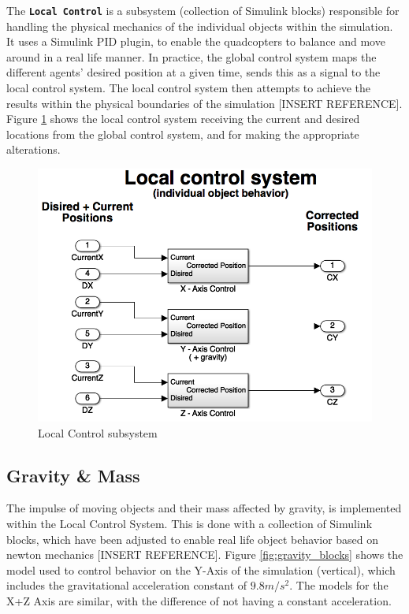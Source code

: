 The \textbf{\texttt{Local Control}} is a subsystem (collection of Simulink blocks) responsible for handling the physical mechanics of the individual objects within the simulation. It uses a Simulink PID plugin, to enable the quadcopters to balance and move around in a real life manner. In practice, the global control system maps the different agents' desired position at a given time, sends this as a signal to the local control system. The local control system then attempts to achieve the results within the physical boundaries of the simulation [INSERT REFERENCE]. Figure \ref{fig:local_control} shows the local control system receiving the current and desired locations from the global control system, and for making the appropriate alterations.

\begin{figure}
	\centering
	\includegraphics[width=.7\columnwidth]{figures/local_control}
  	\caption{\label{fig:local_control}Local Control subsystem}
\end{figure}

\subsection{Gravity \& Mass}
\label{sec:sim_gravity}

The impulse of moving objects and their mass affected by gravity, is implemented within the Local Control System. This is done with a collection of Simulink blocks, which have been adjusted to enable real life object behavior based on newton mechanics [INSERT REFERENCE]. Figure \ref{fig:gravity_blocks} shows the model used to control behavior on the Y-Axis of the simulation (vertical), which includes the gravitational acceleration constant of ${9.8m/s^2}$. The models for the X+Z Axis are similar, with the difference of not having a constant acceleration.


